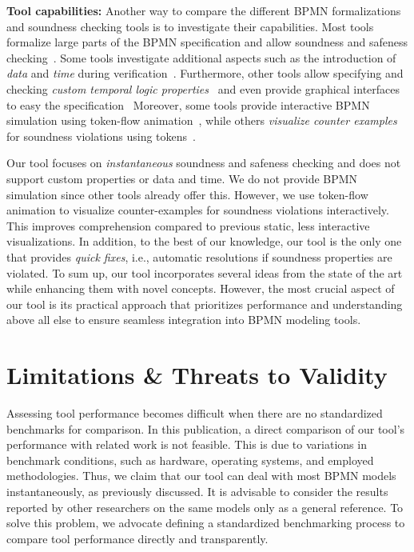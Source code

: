\documentclass[runningheads]{llncs}
\begin{document}
\textbf{Tool capabilities:}
Another way to compare the different BPMN formalizations and soundness checking tools is to investigate their capabilities.
Most tools formalize large parts of the BPMN specification and allow soundness and safeness checking~\cite{corradiniFormalApproachAnalysis2021,houhouFirstOrderLogicVerification2022,krauterFormalizationAnalysisBPMN2023,krauterHigherorderTransformationApproach2023}.
Some tools investigate additional aspects such as the introduction of \textit{data} and \textit{time} during verification~\cite{corradiniFormalisingAnimatingMultiple2022,houhouFirstOrderLogicVerification2022}.
Furthermore, other tools allow specifying and checking \textit{custom temporal logic properties}~\cite{corradiniFormalApproachAnalysis2021,krauterFormalizationAnalysisBPMN2023} and even provide graphical interfaces to easy the specification~\cite{krauterHigherorderTransformationApproach2023}
Moreover, some tools provide interactive BPMN simulation using token-flow animation~\cite{camundaservicesgmbhBpmnjsTokenSimulation2024,corradiniFormalisingAnimatingMultiple2022}, while others \textit{visualize counter examples} for soundness violations using tokens~\cite{houhouFirstOrderLogicVerification2022}.

Our tool focuses on \textit{instantaneous} soundness and safeness checking and does not support custom properties or data and time.
We do not provide BPMN simulation since other tools already offer this.
However, we use token-flow animation to visualize counter-examples for soundness violations interactively.
This improves comprehension compared to previous static, less interactive visualizations.
In addition, to the best of our knowledge, our tool is the only one that provides \textit{quick fixes}, i.e., automatic resolutions if soundness properties are violated.
To sum up, our tool incorporates several ideas from the state of the art while enhancing them with novel concepts.
However, the most crucial aspect of our tool is its practical approach that prioritizes performance and understanding above all else to ensure seamless integration into BPMN modeling tools.

\section{Limitations \& Threats to Validity}
Assessing tool performance becomes difficult when there are no standardized benchmarks for comparison.
In this publication, a direct comparison of our tool's performance with related work is not feasible.
This is due to variations in benchmark conditions, such as hardware, operating systems, and employed methodologies.
Thus, we claim that our tool can deal with most BPMN models instantaneously, as previously discussed.
It is advisable to consider the results reported by other researchers on the same models only as a general reference.
To solve this problem, we advocate defining a standardized benchmarking process to compare tool performance directly and transparently.
\end{document}
